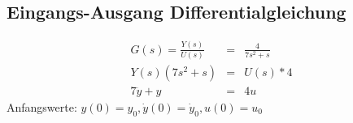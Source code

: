 \subsection{Eingangs-Ausgang Differentialgleichung}

\begin{eqnarray*}
    G(s) =\frac{Y(s)}{U(s)} &=& \frac{4}{7s^2+s} \\
    Y(s)(7s^2+s) &=& U(s) * 4 \\
     7 \ddot y +  y &=& 4u
\end{eqnarray*}
Anfangswerte: \(y(0)=y_0, \dot y(0)=\dot y_0, u(0)=u_0\)

